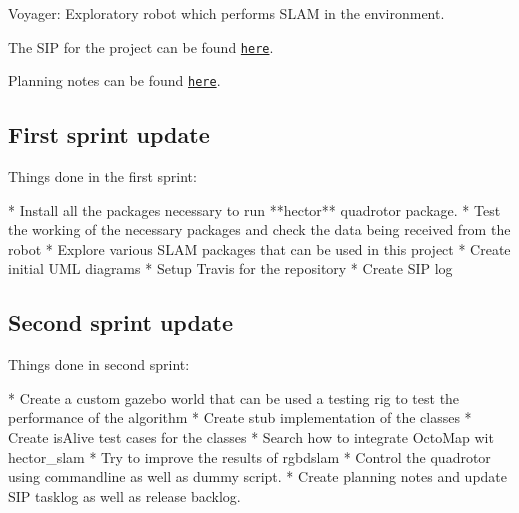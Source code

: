 \href{https://travis-ci.org/nr-parikh/voyager}{\tt } \href{https://github.com/nr-parikh/voyager/blob/master/LICENSE}{\tt }

Voyager\+: Exploratory robot which performs S\+L\+AM in the environment.

The S\+IP for the project can be found \href{https://docs.google.com/spreadsheets/d/11tZz-o4cJSky1bMGR0uIQGLcoGgMJUM74vtqE4XKSQ8/edit?usp=sharing}{\tt here}.

Planning notes can be found \href{https://docs.google.com/document/d/1XSsnkajWHP6XwBxO1Zjkb_wmKyFWa5k23H9Gzb1IpiQ/edit?usp=sharing}{\tt here}.

\subsection*{First sprint update}

Things done in the first sprint\+: \begin{DoxyVerb}* Install all the packages necessary to run **hector** quadrotor package.
* Test the working of the necessary packages and check the data being received from the robot
* Explore various SLAM packages that can be used in this project
* Create initial UML diagrams
* Setup Travis for the repository
* Create SIP log
\end{DoxyVerb}


\subsection*{Second sprint update}

Things done in second sprint\+: \begin{DoxyVerb}* Create a custom gazebo world that can be used a testing rig to test the performance of the algorithm 
* Create stub implementation of the classes 
* Create isAlive test cases for the classes 
* Search how to integrate OctoMap wit hector_slam 
* Try to improve the results of rgbdslam 
* Control the quadrotor using commandline as well as dummy script.
* Create planning notes and update SIP tasklog as well as release backlog.  \end{DoxyVerb}
 